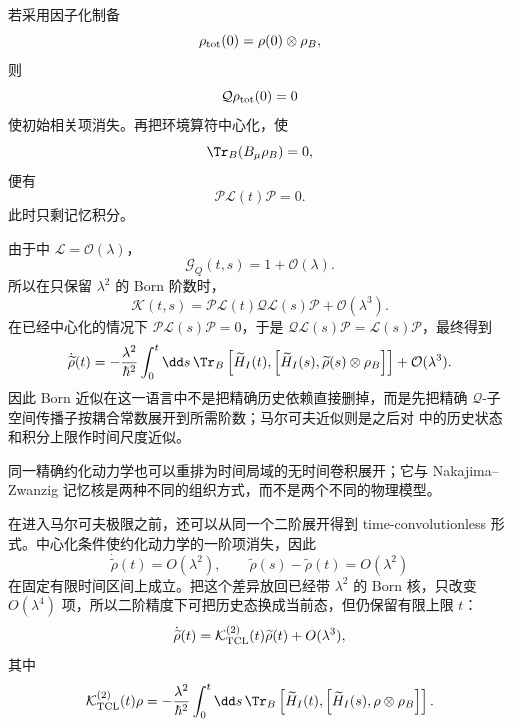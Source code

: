 若采用因子化制备
\[
\rho_{\rm tot}(0)
=
\rho(0)\otimes\rho_B,
\]
则
\[
\mathcal Q\rho_{\rm tot}(0)=0
\]
使初始相关项消失。再把环境算符中心化，使
\[
\Tr_B(B_\mu\rho_B)=0,
\]
便有
\[
\mathcal P\mathcal L(t)\mathcal P=0.
\]
此时只剩记忆积分。

由于中
\(\mathcal L=\mathcal O(\lambda)\)，
\[
\mathcal G_Q(t,s)
=
1+\mathcal O(\lambda).
\]
所以在只保留 \(\lambda^2\) 的 Born 阶数时，
\[
\mathcal K(t,s)
=
\mathcal P\mathcal L(t)
\mathcal Q\mathcal L(s)\mathcal P
+
\mathcal O(\lambda^3).
\]
在已经中心化的情况下
\(\mathcal P\mathcal L(s)\mathcal P=0\)，于是
\(\mathcal Q\mathcal L(s)\mathcal P
=\mathcal L(s)\mathcal P\)，最终得到
\begin{equation}\label{eq:phys-oqs-born-memory-from-nz}
\dot{\widetilde\rho}(t)
=
-\frac{\lambda^2}{\hbar^2}
\int_0^t\dd s\,
\Tr_B
\left[
\widetilde H_I(t),
\left[
\widetilde H_I(s),
\widetilde\rho(s)\otimes\rho_B
\right]
\right]
+
\mathcal O(\lambda^3).
\end{equation}
因此 Born 近似在这一语言中不是把精确历史依赖直接删掉，而是先把精确
\(\mathcal Q\)-子空间传播子按耦合常数展开到所需阶数；马尔可夫近似则是之后对
中的历史状态和积分上限作时间尺度近似。

同一精确约化动力学也可以重排为时间局域的无时间卷积展开；它与 Nakajima--Zwanzig 记忆核是两种不同的组织方式，而不是两个不同的物理模型。

在进入马尔可夫极限之前，还可以从同一个二阶展开得到 time-convolutionless 形式。中心化条件使约化动力学的一阶项消失，因此
\[
\dot{\widetilde\rho}(t)=O(\lambda^2),
\qquad
\widetilde\rho(s)-\widetilde\rho(t)=O(\lambda^2)
\]
在固定有限时间区间上成立。把这个差异放回已经带 \(\lambda^2\) 的 Born 核，只改变 \(O(\lambda^4)\) 项，所以二阶精度下可把历史态换成当前态，但仍保留有限上限 \(t\)：
\begin{equation}\label{eq:phys-oqs-tcl2}
\dot{\widetilde\rho}(t)
=\mathcal K_{\rm TCL}^{(2)}(t)\widetilde\rho(t)+O(\lambda^3),
\end{equation}
其中
\begin{equation}\label{eq:phys-oqs-tcl2-generator}
\mathcal K_{\rm TCL}^{(2)}(t)\rho
=-\frac{\lambda^2}{\hbar^2}
\int_0^t\dd s\,
\Tr_B
\left[
\widetilde H_I(t),
\left[
\widetilde H_I(s),
\rho\otimes\rho_B
\right]
\right].
\end{equation}

